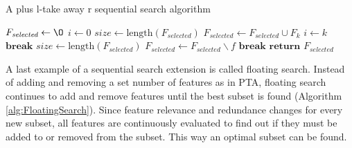\documentclass[10pt,a4paper]{article}
\begin{document}
\begin{itemize}
		\begin{algorithm}[H]
			\caption{A plus l-take away r sequential search algorithm\cite{Reunanen2006}}\label{alg:PTA}
			\begin{algorithmic}[1]
				\State $F_{\textit{selected}} \gets \O$			
				\State $i \gets 0$								
									
				\State $\textit{size} \gets \text{length}(F_{\textit{selected}})$ 
					
					
				\State $F_{\textit{selected}} \gets F_{\textit{selected}} \cup F_k$ 
				\EndIf
				\State $i \gets k$						
				 	
				\State $\textbf{break}$
				\EndIf
				\EndFor
				\State $\textit{size} \gets \text{length}(F_{\textit{selected}})$ 
					
					
				\State $F_{\textit{selected}} \gets F_{\textit{selected}} \backslash f$ 
				\EndIf
				 	
				\State $\textbf{break}$
				\EndIf
				\EndFor
				\EndWhile
				\State $\textbf{return } F_{\textit{selected}}$
				\EndProcedure
			\end{algorithmic}
		\end{algorithm}
		
		A last example of a sequential search extension is called floating search. Instead of adding and removing a set number of features as in PTA, floating search continues to add and remove features until the best subset is found (Algorithm \ref{alg:FloatingSearch}). Since feature relevance and redundance changes for every new subset, all features are continuously evaluated to find out if they must be added to or removed from the subset. This way an optimal subset can be found\cite{Reunanen2006}.
		

\end{itemize}
\end{document}
